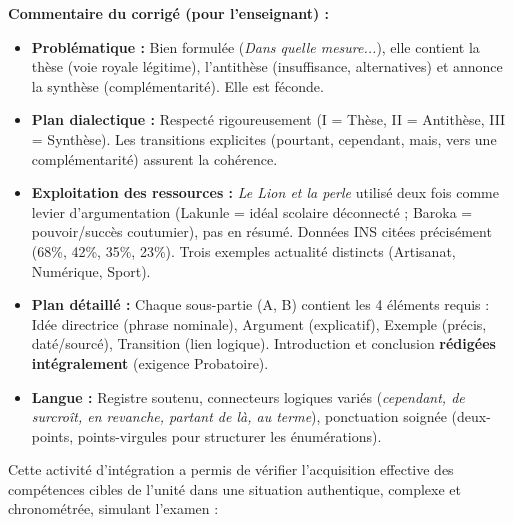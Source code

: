 \documentclass[11pt]{article}
\newcommand{\cle}[1]{{\popxbold\color{popdark}#1}}
\newcounter{popsec}
\newcounter{popsub}
\newcommand{\courssub}[1]{%
  \stepcounter{popsub}%
  \par\vspace{9pt}\noindent{\popxbold\fontsize{11.5}{13}\selectfont\color{popink}{\color{poporange}\thepopsec.\thepopsub}\hspace{6pt}#1}\par\nopagebreak\vspace{4pt}
}
\begin{document}
\begin{exoresolu}
\tcblower
\textbf{Commentaire du corrigé (pour l'enseignant) :}
\begin{itemize}
    \item \textbf{Problématique :} Bien formulée (\emph{Dans quelle mesure...}), elle contient la thèse (voie royale légitime), l'antithèse (insuffisance, alternatives) et annonce la synthèse (complémentarité). Elle est \cle{féconde}.
    \item \textbf{Plan dialectique :} Respecté rigoureusement (I = Thèse, II = Antithèse, III = Synthèse). Les transitions explicites (pourtant, cependant, mais, vers une complémentarité) assurent la cohérence.
    \item \textbf{Exploitation des ressources :} \emph{Le Lion et la perle} utilisé deux fois comme levier d'argumentation (Lakunle = idéal scolaire déconnecté ; Baroka = pouvoir/succès coutumier), pas en résumé. Données INS citées précisément (68\%, 42\%, 35\%, 23\%). Trois exemples actualité distincts (Artisanat, Numérique, Sport).
    \item \textbf{Plan détaillé :} Chaque sous-partie (A, B) contient les 4 éléments requis : Idée directrice (phrase nominale), Argument (explicatif), Exemple (précis, daté/sourcé), Transition (lien logique). Introduction et conclusion \textbf{rédigées intégralement} (exigence Probatoire).
    \item \textbf{Langue :} Registre soutenu, connecteurs logiques variés (\emph{cependant, de surcroît, en revanche, partant de là, au terme}), ponctuation soignée (deux-points, points-virgules pour structurer les énumérations).
\end{itemize}
\end{exoresolu}

\courssub{Bilan de l'activité}
\label{bilan:integration}
Cette activité d'intégration a permis de vérifier l'acquisition effective des compétences cibles de l'unité dans une situation authentique, complexe et chronométrée, simulant l'examen :
\end{document}
